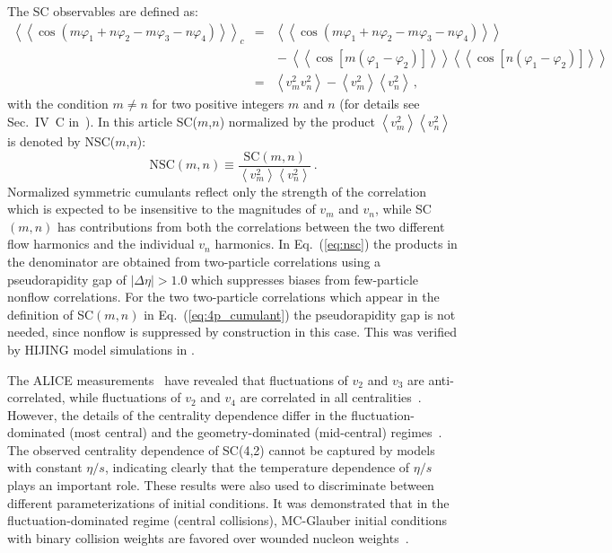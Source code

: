 The SC observables are defined as:
\begin{eqnarray}
\left<\left<\cos(m\varphi_1\!+\!n\varphi_2\!-\!m\varphi_3-\!n\varphi_4)\right>\right>_c &=& \left<\left<\cos(m\varphi_1\!+\!n\varphi_2\!-\!m\varphi_3-\!n\varphi_4)\right>\right>\nonumber\\
&&{}-\left<\left<\cos[m(\varphi_1\!-\!\varphi_2)]\right>\right>\left<\left<\cos[n(\varphi_1\!-\!\varphi_2)]\right>\right>\nonumber\\
&=&\left<v_{m}^2v_{n}^2\right>-\left<v_{m}^2\right>\left<v_{n}^2\right>\,,%
\label{eq:4p_cumulant}
\end{eqnarray}
%
with the condition $m\neq n$ for two positive integers $m$ and $n$ (for details see Sec.~IV~C in~\cite{Bilandzic:2013kga}).
In this article SC($m$,$n$) normalized by the product $\left<v_{m}^2\right>\left<v_{n}^2\right>$~\cite{ALICE:2016kpq,Giacalone:2016afq} is denoted by NSC($m$,$n$):
%
\begin{equation}
\mathrm{NSC}(m,n) \equiv \frac{\mathrm{SC}(m,n)}{\left<v_{m}^2\right>\left<v_{n}^2\right>}\,.
\label{eq:nsc}
\end{equation}
%
Normalized symmetric cumulants reflect only the strength of the correlation which is expected to be insensitive to the magnitudes of $v_{m}$ and $v_{n}$, while SC$(m,n)$ has contributions from both the correlations between the two different flow harmonics and the individual $v_{n}$ harmonics. In Eq.~(\ref{eq:nsc}) the products in the denominator are obtained from two-particle correlations using a pseudorapidity gap of $|\Delta\eta|>1.0$ which suppresses biases from few-particle nonflow correlations. For the two two-particle correlations which appear in the definition of SC$(m,n)$ in Eq.~(\ref{eq:4p_cumulant}) the pseudorapidity gap is not needed, since nonflow is suppressed by construction in this case. This was verified by HIJING model simulations in \cite{ALICE:2016kpq}.

The ALICE measurements~\cite{ALICE:2016kpq} have revealed that fluctuations of $v_2$ and $v_3$ are anti-correlated, while fluctuations of $v_2$ and $v_4$ are correlated in all centralities~\cite{ALICE:2016kpq}. However, the details of the centrality dependence differ in the fluctuation-dominated (most central) and the geometry-dominated (mid-central) regimes~\cite{ALICE:2016kpq}. The observed centrality dependence of SC(4,2) cannot be captured by models with constant $\eta/s$, indicating clearly that the temperature dependence of $\eta/s$ plays an important role. These results were also used to discriminate between different parameterizations of initial conditions. It was demonstrated that in the fluctuation-dominated regime (central collisions), MC-Glauber initial conditions with binary collision weights are favored over wounded nucleon weights~\cite{ALICE:2016kpq}. 


